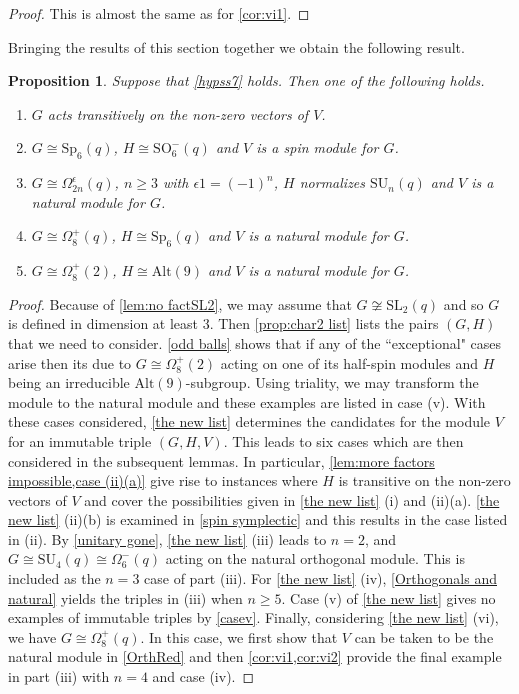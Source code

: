 \documentclass[12pt]{amsart}
\newtheorem{proposition}[theorem]{Proposition}
\theoremstyle{remark}
\theoremstyle{notation}
\theoremstyle{definition}
\newcommand{\SU}{\mathrm{SU}}
\newcommand{\Sp}{\mathrm{Sp}}
\newcommand{\SL}{\mathrm{SL}}
\newcommand{\0}{\emptyset}
\newcommand{\SO}{\mathrm{SO}}
\newcommand{\Alt}{\mathrm{Alt}}
\begin{document}
\begin{proof} This is almost the same as for \cref{cor:vi1}.
\end{proof}




 Bringing the results of this section together we obtain the following result.


\begin{proposition}\label{prop:classical} Suppose that \cref{hypss7} holds. Then one of the following holds.
\begin{enumerate}
\item $G$ acts transitively on the non-zero vectors of $V$.
\item $G \cong \Sp_{6}(q)$, $H \cong \SO_6^-(q)$ and $  V$ is a spin module for $G$.
\item $G \cong \Omega_{2n}^\epsilon(q)$, $n \ge 3$ with $\epsilon 1= (-1)^n$, $H$ normalizes $\SU_{n}(q)$ and $V$ is a natural module for $G$.
\item $G \cong \Omega_8^+(q)$, $H \cong \Sp_6(q)$ and $V$ is a natural module for $G$.
\item $G \cong \Omega_8^+(2)$, $H \cong \Alt(9)$ and $V$ is a natural module for $G$.
\end{enumerate}
\end{proposition}

\begin{proof} Because of \cref{lem:no factSL2}, we may assume that $G \not \cong \SL_2(q)$ and so  $G$  is defined in dimension at least $3$. Then \cref{prop:char2 list} lists the pairs $(G,H)$ that we need to consider.  \cref{odd balls} shows that if any of the ``exceptional" cases arise then its due to $G\cong \Omega_8^+(2)$ acting on one of its half-spin modules and $H$ being an irreducible $\Alt(9)$-subgroup. Using triality, we may transform the module to the natural module and these examples are  listed in case (v). With these cases considered, \cref{the new list} determines the candidates for the module $V$ for an immutable triple $(G,H,V)$. This leads to six cases which are then considered in the subsequent lemmas.  In particular, \cref{lem:more factors impossible,case (ii)(a)} give rise to instances where $H$ is transitive on the non-zero vectors of $V$ and cover the possibilities given in \cref{the new list} (i) and (ii)(a).  \cref{the new list} (ii)(b) is examined in \cref{spin symplectic} and this results in the case listed in (ii). By \cref{unitary gone},
\cref{the new list} (iii) leads to $n=2$, and $G \cong \SU_4(q)\cong \Omega_6^-(q)$ acting on the natural orthogonal module. This is included as the $n=3$ case of part (iii).
For \cref{the new list} (iv), \cref{Orthogonals and natural} yields the triples in (iii) when $n \ge 5$.  Case (v) of \cref{the new list} gives no examples of immutable triples by \cref{casev}. Finally, considering  \cref{the new list} (vi), we have $G \cong \Omega_8^+(q)$. In this case, we first show that $V$ can be taken to be the natural module in \cref{OrthRed} and then \cref{cor:vi1,cor:vi2} provide the final example in part (iii) with $n=4$ and case (iv).
\end{proof}
\end{document}
